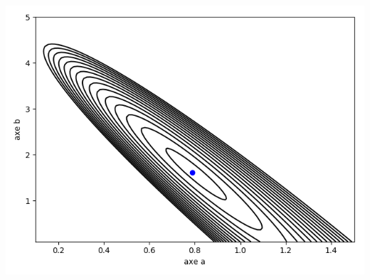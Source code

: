 \begin{exemple}{}{}
	
	\begin{center}
		\includegraphics[scale=\myscale,scale=0.7]{figures/fonctions-regression}
	\end{center}
	
\end{exemple}
